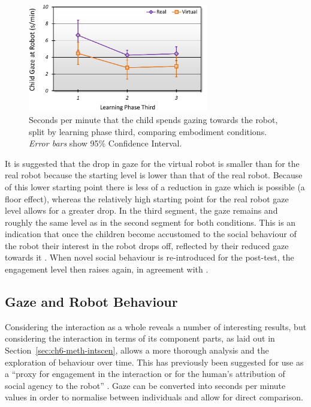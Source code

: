 \begin{figure}[t!]
    \centering
    \includegraphics[width=0.7\textwidth]{images/ch6_GazeBySectionVvsR.pdf}
    \caption{Seconds per minute that the child spends gazing towards the robot, split by learning phase third, comparing embodiment conditions. \textit{Error bars} show 95\% Confidence Interval.}
    \label{fig:ch6-gazemainint}
\end{figure}

It is suggested that the drop in gaze for the virtual robot is smaller than for the real robot because the starting level is lower than that of the real robot. Because of this lower starting point there is less of a reduction in gaze which is possible (a floor effect), whereas the relatively high starting point for the real robot gaze level allows for a greater drop. In the third segment, the gaze remains and roughly the same level as in the second segment for both conditions. This is an indication that once the children become accustomed to the social behaviour of the robot their interest in the robot drops off, reflected by their reduced gaze towards it \citep{baxter2014tracking}. When novel social behaviour is re-introduced for the post-test, the engagement level then raises again, in agreement with \cite{szafir2012pay}.

\subsection{Gaze and Robot Behaviour} \label{sec:ch6-results-segments}
Considering the interaction as a whole reveals a number of interesting results, but considering the interaction in terms of its component parts, as laid out in Section~\ref{sec:ch6-meth-intscen}, allows a more thorough analysis and the exploration of behaviour over time. This has previously been suggested for use as a ``proxy for engagement in the interaction or for the human's attribution of social agency to the robot'' \citep{baxter2014tracking}. Gaze can be converted into seconds per minute values in order to normalise between individuals and allow for direct comparison.

